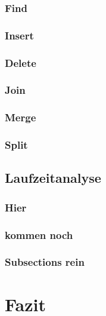 \documentclass[a4paper]{scrreprt}
\theoremstyle{definition}
\begin{document}
\subsection{Find}
\label{sec:find}

\subsection{Insert}
\label{sec:insert}

\subsection{Delete}
\label{sec:delete}

\subsection{Join}
\label{sec:join}

\subsection{Merge}
\label{sec:merge}

\subsection{Split}
\label{sec:split}

\section{Laufzeitanalyse}
\label{sec:runtime}

\subsection{Hier}
\label{sec:section1}

\subsection{kommen noch}
\label{sec:section2}

\subsection{Subsections rein}
\label{sec:section3}

\chapter{Fazit}
\label{sec:closing}



\end{document}
